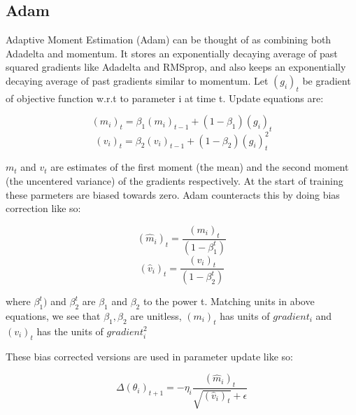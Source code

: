 \documentclass{article}
\begin{document}
\subsection{Adam}
	Adaptive Moment Estimation (Adam) \cite{adam} can be thought of as combining both Adadelta and momentum. It stores an exponentially decaying average of past squared gradients like Adadelta and RMSprop, and also keeps an exponentially decaying average of past gradients similar to momentum. Let $(g_i)_{t}$ be gradient of objective function w.r.t to parameter i at time t. Update equations are:
	
	\begin{center} 
		\begin{equation} (m_{i})_{t} = \beta_{1} (m_{i})_{t-1} + (1 - \beta_{1}) (g_i)_{t}  \end{equation}
		\begin{equation} (v_{i})_{t} = \beta_{2} (v_{i})_{t-1} + (1 - \beta_{2}) (g_i)^{2}_{t}  \end{equation}
	\end{center}

	$m_{t}$ and $v_{t}$ are estimates of the first moment (the mean) and the second moment (the uncentered variance) of the gradients respectively. At the start of training these parmeters are biased towards zero. Adam counteracts this by doing bias correction like so:

	\begin{center} 
		\begin{equation} (\hat{m}_{i})_{t} = \frac{(m_{i})_{t}}{(1 - \beta_{1}^{t})}  \end{equation}
		\begin{equation} (\hat{v}_{i})_{t} = \frac{(v_{i})_{t}}{(1 - \beta_{2}^{t})}  \end{equation}
    \end{center}
	
	where $\beta_{1}^{t})$ and $\beta_{2}^{t}$ are $\beta_{1}$ and $\beta_{2}$ to the power t. Matching units in above equations, we see that $\beta_{1}, \beta_{2}$ are unitless, $(m_{i})_{t}$ has units of $gradient_{i}$ and $(v_{i})_{t}$ has the units of $gradient_{i}^{2}$
	
	These bias corrected versions are used in parameter update like so:
	
	\begin{center} 
		\begin{equation} \Delta (\theta_{i})_{t+1} =  - \eta_{i} \frac{(\hat{m}_{i})_{t}}{\sqrt{(\hat{v}_{i})_{t}} + \epsilon} 	\label{eq:adamupdate} \end{equation}
	\end{center}
\end{document}
